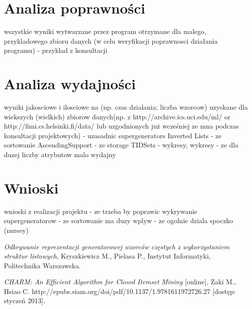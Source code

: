 \documentclass[a4paper,10pt]{article}
\begin{document}
\section{Analiza poprawności}
wszystkie wyniki wytwarzane przez program otrzymane dla malego,
przykladowego zbioru danych (w celu weryfikacji poprawnosci działania
programu)
- przyklad z konsultacji



\section{Analiza wydajności}
wyniki jakosciowe i ilosciowe na (np. czas dzialania; liczba wzorcow)
uzyskane dla wiekszych (wielkich) zbiorow danych(np. z
http://archive.ics.uci.edu/ml/ or http://fimi.cs.helsinki.fi/data/ lub
uzgodnionych już wcześniej ze mna podczas konsultacji projektowych)
- uzasadnic supergenerators Inverted Lists
- ze sortowanie AscendingSupport
- ze storage TIDSets
- wykresy, wykresy
- ze dla duzej liczby atrybutow malo wydajny



\section{Wnioski}
wnioski z realizacji projektu
- ze trzeba by poprawic wykrywanie supergeneratorow
- ze sortowanie ma duzy wplyw
- ze ogolnie dziala spoczko (nursey)



\begin{thebibliography}{*}

  \emph{Odkrywanie reprezentacji generatorowej wzorców częstych z wykorzystaniem struktur listowych},
  Kryszkiewicz M., Pielasa P.,
  Instytut Informatyki,
  Politechnika Warszawska.

  \emph{CHARM: An Efficient Algorithm for Closed Itemset Mining} [online],
  Zaki M., Hsiao C.
  http://epubs.siam.org/doi/pdf/10.1137/1.9781611972726.27 [dostęp: styczeń 2013].

\end{thebibliography}
\end{document}
